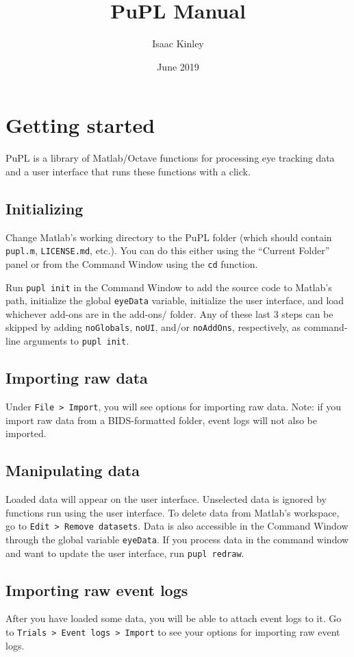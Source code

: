 \documentclass{article}
\title{PuPL Manual}
\author{Isaac Kinley}
\date{June 2019}
\begin{document}
\maketitle
\tableofcontents

\section{Getting started}
PuPL is a library of Matlab/Octave functions for processing eye tracking data and a user interface that runs these functions with a click.

\subsection{Initializing}
Change Matlab's working directory to the PuPL folder (which should contain \texttt{pupl.m}, \texttt{LICENSE.md}, etc.). You can do this either using the ``Current Folder'' panel or from the Command Window using the \texttt{cd} function.

Run \texttt{pupl init} in the Command Window to add the source code to Matlab's path, initialize the global \texttt{eyeData} variable, initialize the user interface, and load whichever add-ons are in the add-ons/ folder. Any of these last 3 steps can be skipped by adding \texttt{noGlobals}, \texttt{noUI}, and/or \texttt{noAddOns}, respectively, as command-line arguments to \texttt{pupl init}.
\subsection{Importing raw data}
Under \texttt{File > Import}, you will see options for importing raw data. Note: if you import raw data from a BIDS-formatted folder, event logs will not also be imported.
\subsection{Manipulating data}
Loaded data will appear on the user interface. Unselected data is ignored by functions run using the user interface. To delete data from Matlab's workspace, go to \texttt{Edit > Remove datasets}. Data is also accessible in the Command Window through the global variable \texttt{eyeData}. If you process data in the command window and want to update the user interface, run \texttt{pupl redraw}.
\subsection{Importing raw event logs}
After you have loaded some data, you will be able to attach event logs to it. Go to \texttt{Trials > Event logs > Import} to see your options for importing raw event logs.
\end{document}
